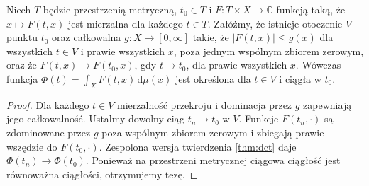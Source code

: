 \begin{twierdzenie}
\label{thm:parameter-continuity}
Niech $T$ będzie przestrzenią metryczną, $t_0\in T$
i $F:T\times X\to\mathbb C$ funkcją taką, że
$x\mapsto F(t,x)$ jest mierzalna dla każdego $t\in T$.
Załóżmy, że istnieje otoczenie $V$ punktu $t_0$
oraz całkowalna $g:X\to[0,\infty]$ takie, że
$|F(t,x)|\le g(x)$ dla wszystkich $t\in V$ i
prawie wszystkich $x$, poza jednym wspólnym zbiorem
zerowym, oraz że $F(t,x)\to F(t_0,x)$, gdy
$t\to t_0$, dla prawie wszystkich $x$.
Wówczas funkcja
$\Phi(t)=\int_XF(t,x)\,\mathrm d\mu(x)$
jest określona dla $t\in V$ i ciągła w $t_0$.
\end{twierdzenie}
\begin{proof}
Dla każdego $t\in V$ mierzalność przekroju i dominacja
przez $g$ zapewniają jego całkowalność. Ustalmy dowolny
ciąg $t_n\to t_0$ w $V$. Funkcje
$F(t_n,\cdot)$ są zdominowane przez $g$ poza
wspólnym zbiorem zerowym i zbiegają prawie wszędzie
do $F(t_0,\cdot)$. Zespolona wersja twierdzenia
\ref{thm:dct} daje $\Phi(t_n)\to\Phi(t_0)$.
Ponieważ na przestrzeni metrycznej ciągowa
ciągłość jest równoważna ciągłości, otrzymujemy tezę.
\end{proof}

